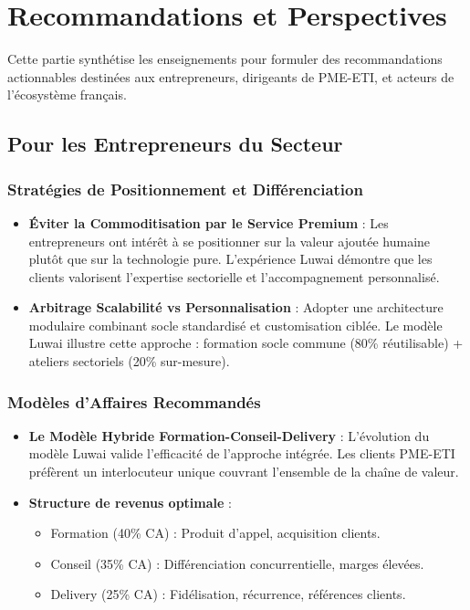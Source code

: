\chapter{Recommandations et Perspectives}
\label{chap:recommendations}

Cette partie synthétise les enseignements pour formuler des recommandations actionnables destinées aux entrepreneurs, dirigeants de PME-ETI, et acteurs de l'écosystème français.

\section{Pour les Entrepreneurs du Secteur}

\subsection{Stratégies de Positionnement et Différenciation}

\begin{itemize}
    \item \textbf{Éviter la Commoditisation par le Service Premium} : Les entrepreneurs ont intérêt à se positionner sur la valeur ajoutée humaine plutôt que sur la technologie pure. L'expérience Luwai démontre que les clients valorisent l'expertise sectorielle et l'accompagnement personnalisé.
    \item \textbf{Arbitrage Scalabilité vs Personnalisation} : Adopter une architecture modulaire combinant socle standardisé et customisation ciblée. Le modèle Luwai illustre cette approche : formation socle commune (80\% réutilisable) + ateliers sectoriels (20\% sur-mesure).
\end{itemize}

\subsection{Modèles d'Affaires Recommandés}

\begin{itemize}
    \item \textbf{Le Modèle Hybride Formation-Conseil-Delivery} : L'évolution du modèle Luwai valide l'efficacité de l'approche intégrée. Les clients PME-ETI préfèrent un interlocuteur unique couvrant l'ensemble de la chaîne de valeur.
    \item \textbf{Structure de revenus optimale} :
    \begin{itemize}
        \item Formation (40\% CA) : Produit d'appel, acquisition clients.
        \item Conseil (35\% CA) : Différenciation concurrentielle, marges élevées.
        \item Delivery (25\% CA) : Fidélisation, récurrence, références clients.
    \end{itemize}
\end{itemize}

